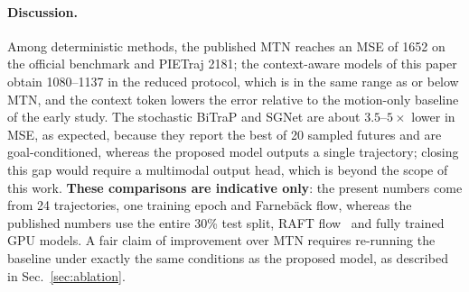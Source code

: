 \begin{table}[t]
\centering
\caption{Comparison with published results (MSE, C-MSE, CF-MSE at 1.5\,s, squared pixels). Published rows are copied from Table~III of~\citep{iddped2025} (full test split, RAFT flow, GPU training). The rows for the present models use the reduced protocol described above and are therefore \emph{not directly comparable}.}
\label{tab:prior}
\scriptsize{}
\end{table}

\paragraph{Discussion.} Among deterministic methods, the published MTN reaches an MSE of 1652 on the official benchmark and PIETraj 2181; the context-aware models of this paper obtain 1080--1137 in the reduced protocol, which is in the same range as or below MTN, and the context token lowers the error relative to the motion-only baseline of the early study. The stochastic BiTraP and SGNet are about $3.5$--$5\times$ lower in MSE, as expected, because they report the best of 20 sampled futures and are goal-conditioned, whereas the proposed model outputs a single trajectory; closing this gap would require a multimodal output head, which is beyond the scope of this work. \textbf{These comparisons are indicative only}: the present numbers come from 24 trajectories, one training epoch and Farneb\"ack flow, whereas the published numbers use the entire 30\% test split, RAFT flow~\citep{teed2020raft} and fully trained GPU models. A fair claim of improvement over MTN requires re-running the baseline under exactly the same conditions as the proposed model, as described in Sec.~\ref{sec:ablation}.
